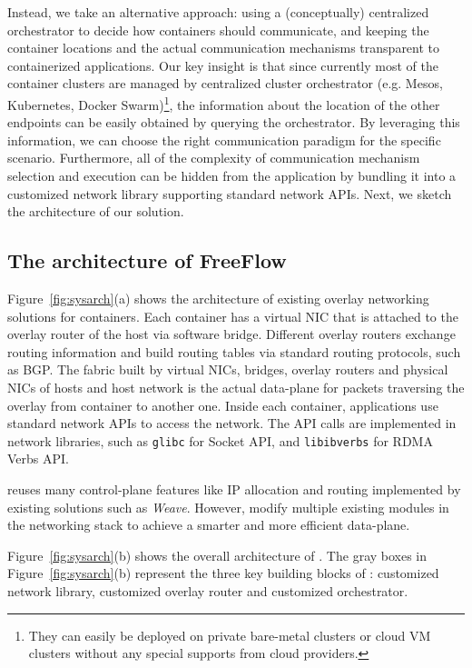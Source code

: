 Instead, we take an alternative approach: using a (conceptually) centralized
orchestrator to decide how containers should communicate, and keeping the
container locations and the actual communication mechanisms transparent to
containerized applications. Our key insight is that since currently most of the
container clusters are managed by centralized cluster orchestrator (e.g. Mesos,
Kubernetes, Docker Swarm)\footnote{They can easily be deployed on private
bare-metal clusters or cloud VM clusters without any special supports from cloud
providers.}, the information about the location of the other endpoints can be
easily obtained by querying the orchestrator. By leveraging this information, we
can choose the right communication paradigm for the specific scenario.
Furthermore, all of the complexity of communication mechanism selection and
execution can be hidden from the application by bundling it into a customized
network library supporting standard network APIs.  Next, we sketch the
architecture of our solution.

\subsection{The architecture of FreeFlow}

Figure~\ref{fig:sysarch}(a) shows the architecture of existing overlay
networking solutions for containers. Each container has a virtual NIC that is
attached to the overlay router of the host via software bridge. Different
overlay routers exchange routing information and build routing tables via
standard routing protocols, such as BGP. The fabric built by virtual NICs,
bridges, overlay routers and physical NICs of hosts and host network is the
actual data-plane for packets traversing the overlay from container to another
one. Inside each container, applications use standard network APIs to access the
network. The API calls are implemented in network libraries, such as
\texttt{glibc} for Socket API, and \texttt{libibverbs} for RDMA Verbs API.

\sysname reuses many control-plane features like IP allocation and routing
implemented by existing solutions such as {\em Weave}.  However, \sysname
modify multiple existing modules in the networking stack to achieve a smarter
and more efficient data-plane.

Figure~\ref{fig:sysarch}(b) shows the overall architecture of \sysname.  The
gray boxes in Figure~\ref{fig:sysarch}(b) represent the three key building
blocks of \sysname: customized network library, customized overlay router and
customized orchestrator.

